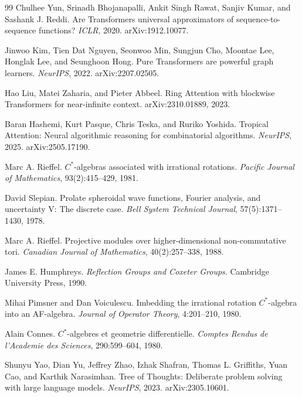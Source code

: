 \documentclass[11pt]{article}
\theoremstyle{definition}
\theoremstyle{plain}
\theoremstyle{remark}
\numberwithin{equation}{section}
\begin{document}
\begin{thebibliography}{99}
Chulhee Yun, Srinadh Bhojanapalli, Ankit Singh Rawat, Sanjiv Kumar, and Sashank J. Reddi.
\newblock Are Transformers universal approximators of sequence-to-sequence functions?
\newblock \emph{ICLR}, 2020. arXiv:1912.10077.

Jinwoo Kim, Tien Dat Nguyen, Seonwoo Min, Sungjun Cho, Moontae Lee, Honglak Lee, and Seunghoon Hong.
\newblock Pure Transformers are powerful graph learners.
\newblock \emph{NeurIPS}, 2022. arXiv:2207.02505.

Hao Liu, Matei Zaharia, and Pieter Abbeel.
\newblock Ring Attention with blockwise Transformers for near-infinite context.
\newblock arXiv:2310.01889, 2023.

Baran Hashemi, Kurt Pasque, Chris Teska, and Ruriko Yoshida.
\newblock Tropical Attention: Neural algorithmic reasoning for combinatorial algorithms.
\newblock \emph{NeurIPS}, 2025. arXiv:2505.17190.

Marc A. Rieffel.
\newblock $C^*$-algebras associated with irrational rotations.
\newblock \emph{Pacific Journal of Mathematics}, 93(2):415--429, 1981.

David Slepian.
\newblock Prolate spheroidal wave functions, Fourier analysis, and uncertainty V: The discrete case.
\newblock \emph{Bell System Technical Journal}, 57(5):1371--1430, 1978.

Marc A. Rieffel.
\newblock Projective modules over higher-dimensional non-commutative tori.
\newblock \emph{Canadian Journal of Mathematics}, 40(2):257--338, 1988.

James E. Humphreys.
\newblock \emph{Reflection Groups and Coxeter Groups}.
\newblock Cambridge University Press, 1990.

Mihai Pimsner and Dan Voiculescu.
\newblock Imbedding the irrational rotation $C^*$-algebra into an AF-algebra.
\newblock \emph{Journal of Operator Theory}, 4:201--210, 1980.

Alain Connes.
\newblock $C^*$-algebres et geometrie differentielle.
\newblock \emph{Comptes Rendus de l'Academie des Sciences}, 290:599--604, 1980.

Shunyu Yao, Dian Yu, Jeffrey Zhao, Izhak Shafran, Thomas L. Griffiths, Yuan Cao, and Karthik Narasimhan.
\newblock Tree of Thoughts: Deliberate problem solving with large language models.
\newblock \emph{NeurIPS}, 2023. arXiv:2305.10601.


\end{thebibliography}
\end{document}
